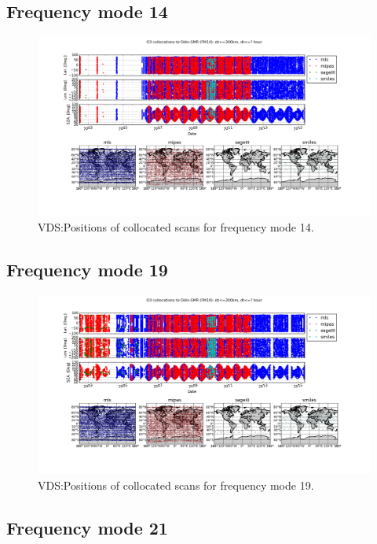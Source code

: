 \subsection{Frequency mode 14}

\begin{figure}[t]
\centering
\includegraphics[width=17cm]{test_collocation_fm14.png}
\caption{VDS:Positions of collocated scans for frequency mode 14.}
\label{fig:vdsfm14}
\end{figure}

\clearpage
\newpage

\subsection{Frequency mode 19}

\begin{figure}[t]
\centering
\includegraphics[width=17cm]{test_collocation_fm19.png}
\caption{VDS:Positions of collocated scans for frequency mode 19.}
\label{fig:vdsfm19}
\end{figure}

\clearpage
\newpage

\subsection{Frequency mode 21}

